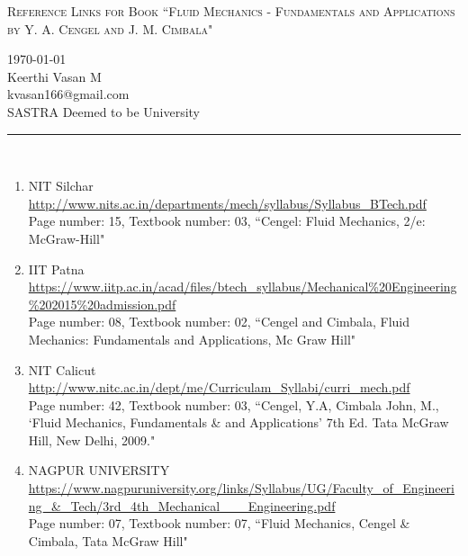 \documentclass[a4paper, 10 pt]{article}
\begin{document}
\thispagestyle{empty}
\sloppy %
\begin{center}
    \large\textsc{Reference Links for Book ``Fluid Mechanics - Fundamentals and Applications by Y. A. Cengel and J. M. Cimbala"}
\end{center}
\begin{center}
 \today \\[2.5 mm] 
 Keerthi Vasan M \\[2.5 mm] 
 kvasan166@gmail.com \\[2.5 mm]
 SASTRA Deemed to be University
\end{center}
\rule{\linewidth}{0.3 pt}\\

\begin{enumerate}
    \item NIT Silchar\\\href{http://www.nits.ac.in/departments/mech/syllabus/Syllabus\_BTech.pdf}{http://www.nits.ac.in/departments/mech/syllabus/Syllabus\_BTech.pdf}\\Page number: 15, Textbook number: 03, ``Cengel: Fluid Mechanics, 2/e: McGraw-Hill"
    
    \item IIT Patna\\ \href{https://www.iitp.ac.in/acad/files/btech\_syllabus/Mechanical\%20Engineering\%202015\%20admission.pdf}{https://www.iitp.ac.in/acad/files/btech\_syllabus/Mechanical\%20Engineering\%202015\%20admission.pdf}\\ Page number: 08, Textbook number: 02, ``Cengel and Cimbala, Fluid Mechanics: Fundamentals and Applications, Mc Graw Hill"
    
    \item NIT Calicut\\ \href{http://www.nitc.ac.in/dept/me/Curriculam\_Syllabi/curri\_mech.pdf}{http://www.nitc.ac.in/dept/me/Curriculam\_Syllabi/curri\_mech.pdf}\\ Page number: 42, Textbook number: 03, ``Cengel, Y.A, Cimbala John, M., `Fluid Mechanics, Fundamentals \& and Applications' 7th Ed. Tata McGraw Hill, New Delhi, 2009."
    
    \item NAGPUR UNIVERSITY\\ \url{https://www.nagpuruniversity.org/links/Syllabus/UG/Faculty\_of\_Engineering\_\&\_Tech/3rd\_4th\_Mechanical\_\_\_Engineering.pdf}\\ Page number: 07, Textbook number: 07, ``Fluid Mechanics, Cengel \& Cimbala, Tata McGraw Hill"
    

\end{enumerate}
\end{document}
